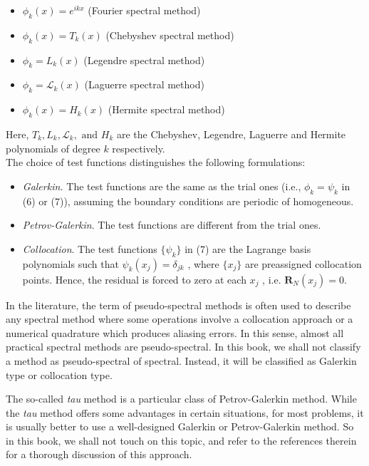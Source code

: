 \begin{itemize}
	\item $ \phi_{ k } (x) = e^{ i k x } $ (Fourier spectral method)
	\item $ \phi_{ k }(x) = T_{ k }(x) $ (Chebyshev spectral method)
	\item $ \phi_{ k } = L_{ k }(x) $ (Legendre spectral method)
	\item $ \phi_{ k }= \mathcal{L}_{ k } (x) $ (Laguerre spectral method)
	\item $ \phi_{ k }(x) = H_{ k }(x) $ (Hermite spectral method) 
\end{itemize}

Here, $ T_{ k }, L_{ k }, \mathcal{L}_{ k }, \text{ and } H_{ k } $ are the Chebyshev, Legendre, Laguerre and Hermite polynomials of degree $ k $ respectively. \\
\indent The choice of test functions distinguishes the following formulations:

\begin{itemize}
	\item \textit{Galerkin.} The test functions are the same as the trial ones (i.e., $ \phi_{ k } = \psi_{ k } $ in (6) or (7)), assuming the boundary conditions are periodic of homogeneous.
	\item \textit{Petrov-Galerkin}. The test functions are different from the trial ones.
	\item \textit{Collocation}. The test functions $ \{ \psi_{ k } \} $ in (7) are the Lagrange basis polynomials such that $ \psi_{ k }(x_{ j }) = \delta_{ jk } $ , where $ \{ x_{ j } \} $  are preassigned collocation points. Hence, the residual is forced to zero at each $ x_{ j } $ , i.e. $ \mathbf{ R }_{ N } (x_{ j }) = 0 $. 
\end{itemize}

\begin{rmk}
In the  literature, the term of pseudo-spectral methods is often used to describe any spectral method where some operations involve a collocation approach or a numerical quadrature which produces aliasing errors. In this sense, almost all practical spectral methods are pseudo-spectral. In this book, we shall not classify a method as pseudo-spectral of spectral. Instead, it will be classified as Galerkin type or collocation type.
\end{rmk}

\begin{rmk}
	The so-called \textit{tau} method is a particular class of Petrov-Galerkin method. While the \textit{tau} method offers some advantages in certain situations, for most problems, it is usually better to use a well-designed Galerkin or Petrov-Galerkin method. So in this book, we shall not touch on this topic, and refer to the references therein for a thorough discussion of this approach.
\end{rmk}

